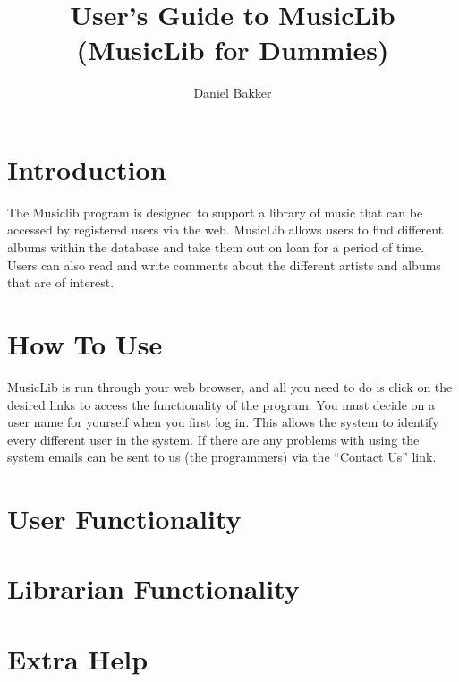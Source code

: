 \documentclass{article}
\title{User's Guide to MusicLib (MusicLib for Dummies)}
\author{Daniel Bakker}
\begin{document}
\maketitle
\tableofcontents

\section{Introduction}
The Musiclib program is designed to support a library of music that can be accessed by registered users via the web. MusicLib allows users to find different albums within the database and take them out on loan for a period of time. Users can also read and write comments about the different artists and albums that are of interest.

\section{How To Use}
MusicLib is run through your web browser, and all you need to do is click on the desired links to access the functionality of the program. You must decide on a user name for yourself when you first log in. This allows the system to identify every different user in the system. If there are any problems with using the system emails can be sent to us (the programmers) via the ``Contact Us'' link.  

\section{User Functionality}


\section{Librarian Functionality}

\section{Extra Help}
\end{document}
